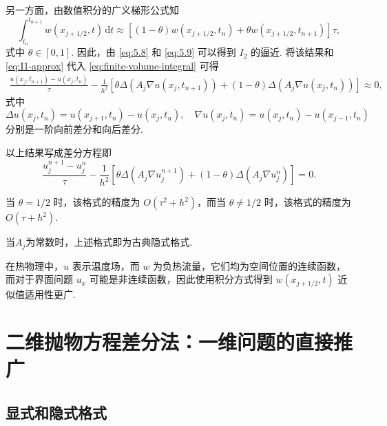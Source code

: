另一方面，由数值积分的广义梯形公式知
\begin{equation}\label{eq:5.9}
    \int_{t_n}^{t_{n+1}} w(x_{j+1/2}, t) \,\mathrm{d}t \approx [(1 - \theta)w(x_{j+1/2}, t_n) + \theta w(x_{j+1/2}, t_{n+1})] \tau,
\end{equation}
式中 $\theta \in [0, 1]$. 因此，由 \eqref{eq:5.8} 和 \eqref{eq:5.9} 可以得到 $I_2$ 的逼近. 将该结果和 \eqref{eq:I1-approx} 代入 \eqref{eq:finite-volume-integral} 可得
\begin{align*}
    \frac{u(x_j, t_{n+1}) - u(x_j, t_n)}{\tau} - \frac{1}{h^2} [\theta \Delta (A_j\nabla u(x_j, t_{n+1})) + (1 - \theta)\Delta (A_j\nabla u(x_j, t_n))] \approx 0,
\end{align*}
式中
\begin{equation*}
    \Delta u(x_j, t_n) = u(x_{j+1}, t_n) - u(x_j, t_n), \quad \nabla u(x_j, t_n) = u(x_j, t_n) - u(x_{j-1}, t_n)
\end{equation*}
分别是一阶向前差分和向后差分.

以上结果写成差分方程即
\begin{equation}\label{eq:5.10}
    \frac{u_j^{n+1} - u_j^n}{\tau} - \frac{1}{h^2} [\theta \Delta (A_j\nabla u_j^{n+1}) + (1 - \theta)\Delta (A_j\nabla u_j^n)] = 0.
\end{equation}

当 $\theta = 1/2$ 时，该格式的精度为 $O(\tau^2 + h^2)$，而当 $\theta \neq 1/2$ 时，该格式的精度为 $O(\tau + h^2)$.\par
当$A_j$为常数时，上述格式即为古典隐式格式.\par

\begin{remark}
在热物理中，$u$ 表示温度场，而 $w$ 为负热流量，它们均为空间位置的连续函数，而对于界面问题 $u_x$ 可能是非连续函数，因此使用积分方式得到 $w(x_{j+1/2}, t)$ 近似值适用性更广.
\end{remark}

\section{二维抛物方程差分法：一维问题的直接推广}

\subsection{显式和隐式格式}

